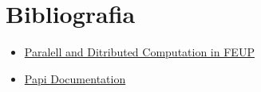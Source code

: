 \section{Bibliografia}


\begin{itemize}
    \item \href{https://moodle.up.pt/pluginfile.php/201904/mod_resource/content/1/CPD_blockMatrixMult.pdf}{Paralell and Ditributed Computation in FEUP}
    \item \href{https://flozz.github.io/pypapi/events.html}{Papi Documentation}
    
\end{itemize}
